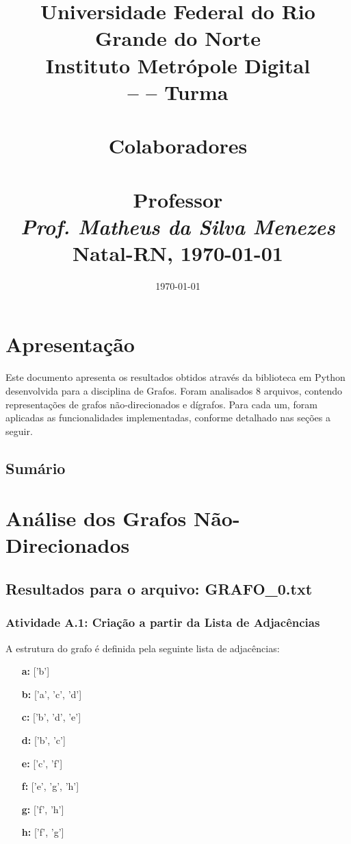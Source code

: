 \documentclass[a4paper,12pt]{article}
\date{\today}
\title{
    \vspace{-2.5cm} %
    \centering %
    \Large\textbf{Universidade Federal do Rio Grande do Norte}\\
    \large Instituto Metrópole Digital \\[0.5em]
    \normalsize \coddisciplina{} -- \nomedisciplina{} -- Turma \codturma \\[1.5em]
    \Large\textbf{\codatividade} \\[1.5em]
    \large\textbf{Colaboradores} \\
    \normalsize\textit{\nomedoaluno} \\[1em]
    \large\textbf{Professor} \\
    \normalsize\textit{Prof. Matheus da Silva Menezes} \\[2.5em]
    \normalsize Natal-RN, \today
    \vspace{-0.5cm} %
}
\author{}
\date{}
\begin{document}
\maketitle

\section*{\centering Apresentação}
Este documento apresenta os resultados obtidos através da biblioteca em Python desenvolvida para a disciplina de Grafos. Foram analisados 8 arquivos, contendo representações de grafos não-direcionados e dígrafos. Para cada um, foram aplicadas as funcionalidades implementadas, conforme detalhado nas seções a seguir.

\subsection*{Sumário}
\tableofcontents
\newpage

\section{Análise dos Grafos Não-Direcionados}

\subsection{Resultados para o arquivo: GRAFO\_0.txt}

\subsubsection*{Atividade A.1: Criação a partir da Lista de Adjacências}
A estrutura do grafo é definida pela seguinte lista de adjacências:
\begin{itemize}[leftmargin=*]
    \item[\textbf{a:}] ['b']
    \item[\textbf{b:}] ['a', 'c', 'd']
    \item[\textbf{c:}] ['b', 'd', 'e']
    \item[\textbf{d:}] ['b', 'c']
    \item[\textbf{e:}] ['c', 'f']
    \item[\textbf{f:}] ['e', 'g', 'h']
    \item[\textbf{g:}] ['f', 'h']
    \item[\textbf{h:}] ['f', 'g']
\end{itemize}
\end{document}
